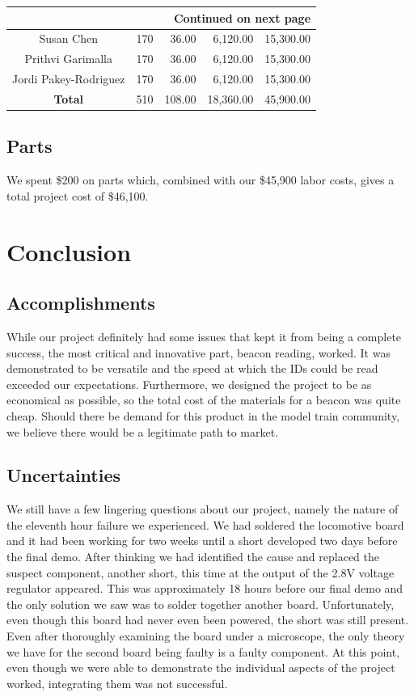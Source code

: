 \documentclass[openbib,letterpaper,10pt]{article}
\begin{document}
\begin{spacing}{1.15}
\begin{center}
\begin{longtable}{|c|c|r|r|r|}
		\hline \multicolumn{5}{|r|}{{Continued on next page}} \\ \hline
		\endfoot
		\endlastfoot
			Susan Chen & 170 & 36.00 & 6,120.00 & 15,300.00 \\ \hline
			Prithvi Garimalla & 170 & 36.00 & 6,120.00 & 15,300.00 \\ \hline
			Jordi Pakey-Rodriguez & 170 & 36.00 & 6,120.00 & 15,300.00 \\ \hline
			\textbf{Total} & 510 & 108.00 & 18,360.00 & 45,900.00 \\ \hline
	\end{longtable}
\end{center}

\subsection{Parts}
We spent \$200 on parts which, combined with our \$45,900 labor costs, gives a total project cost of \$46,100.

\clearpage

\section{Conclusion}

\subsection{Accomplishments}
While our project definitely had some issues that kept it from being a complete success, the most critical and innovative part, beacon reading, worked. It was demonstrated to be versatile and the speed at which the IDs could be read exceeded our expectations. Furthermore, we designed the project to be as economical as possible, so the total cost of the materials for a beacon was quite cheap. Should there be demand for this product in the model train community, we believe there would be a legitimate path to market.

\subsection{Uncertainties}
We still have a few lingering questions about our project, namely the nature of the eleventh hour failure we experienced. We had soldered the locomotive board and it had been working for two weeks until a short developed two days before the final demo. After thinking we had identified the cause and replaced the suspect component, another short, this time at the output of the 2.8V voltage regulator appeared. This was approximately 18 hours before our final demo and the only solution we saw was to solder together another board. Unfortunately, even though this board had never even been powered, the short was still present. Even after thoroughly examining the board under a microscope, the only theory we have for the second board being faulty is a faulty component. At this point, even though we were able to demonstrate the individual aspects of the project worked, integrating them was not successful.


\end{spacing}
\end{document}
